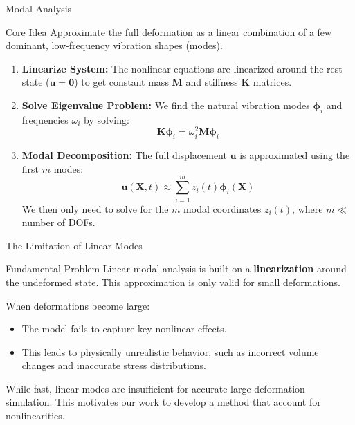 \documentclass{beamer}
\begin{document}
\begin{frame}[allowframebreaks]{Modal Analysis}
    
    \begin{block}{Core Idea}
        Approximate the full deformation as a linear combination of a few dominant, low-frequency vibration shapes (modes).
    \end{block}
    
    \begin{enumerate}
        \item \textbf{Linearize System:} The nonlinear equations are linearized around the rest state (\(\bm{u}=\bm{0}\)) to get constant mass \(\bm{M}\) and stiffness \(\bm{K}\) matrices.
        \vspace{0.5em}
        
        \item \textbf{Solve Eigenvalue Problem:} We find the natural vibration modes \(\bm{\phi}_i\) and frequencies \(\omega_i\) by solving:
            \begin{equation*}
                \bm{K} \bm{\phi}_i = \omega_i^2 \bm{M} \bm{\phi}_i
            \end{equation*}
        \vspace{0.5em}
            
        \item \textbf{Modal Decomposition:} The full displacement \(\bm{u}\) is approximated using the first \(m\) modes:
            \begin{equation*}
                \bm{u}(\bm{X},t) \approx \sum_{i=1}^{m} z_i(t) \bm{\phi}_i(\bm{X})
            \end{equation*}
            We then only need to solve for the \(m\) modal coordinates \(z_i(t)\), where \(m \ll\) number of DOFs.
    \end{enumerate}
\end{frame}

\begin{frame}{The Limitation of Linear Modes}    
    \begin{alertblock}{Fundamental Problem}
        Linear modal analysis is built on a \textbf{linearization} around the undeformed state. This approximation is only valid for small deformations.
    \end{alertblock}
    
    When deformations become large:
    \begin{itemize}
        \item The model fails to capture key nonlinear effects.
        \item This leads to physically unrealistic behavior, such as incorrect volume changes and inaccurate stress distributions.
    \end{itemize}
    
    While fast, linear modes are insufficient for accurate large deformation simulation. This motivates our work to develop a method that account for nonlinearities.
\end{frame}
\end{document}
